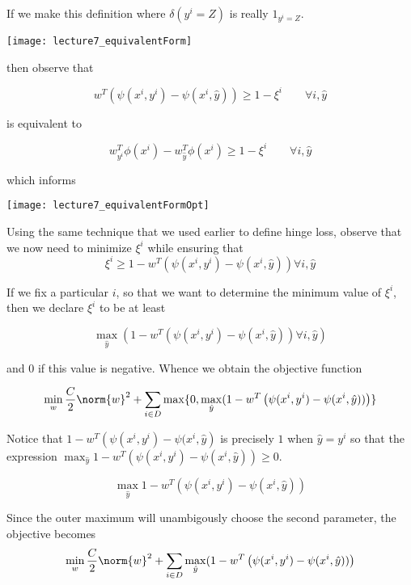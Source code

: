 \documentclass[../main.tex]{subfiles}
\begin{document}
\begin{definition}
    If we make this definition where $\delta(y^{i} = Z)$ is really $1_{y^{i} = Z}$.
    \begin{center}
        \texttt{[image: lecture7\_equivalentForm]}
    \end{center}

    then observe that

    \[
        w^T\left( \psi(x^{i},y^{i}) - \psi(x^{i},\hat{y}) \right) \geq 1 - \xi^{i} \qquad \forall i,\hat{y}
    \]
    
    is equivalent to

    \[
        w_{y^{i}}^T\phi(x^{i}) - w_{\hat{y}}^T\phi(x^{i}) \geq 1 - \xi^{i} \qquad \forall i, \hat{y}
    \]

    which informs \\

    \begin{center}
        \texttt{[image: lecture7\_equivalentFormOpt]}
    \end{center}

    Using the same technique that we used earlier to define hinge loss, observe that
    we now need to minimize $\xi^{i}$ while ensuring that
    \[
        \xi^{i} \geq 1 - w^T\left( \psi(x^{i},y^{i}) - \psi(x^{i},\hat{y}) \right) \forall i, \hat{y}
    \]

    If we fix a particular $i$, so that we want to determine the minimum value of $\xi^{i}$,
    then we declare $\xi^{i}$ to be at least

    \[
        \max_{\hat{y}} (1 - w^T\left( \psi(x^{i},y^{i}) - \psi(x^{i},\hat{y}) \right) \forall i, \hat{y})
    \]

    and $0$ if this value is negative. Whence we obtain the objective function

    \[
        \min_{w} \frac{C}{2}\norm{w}^2 + \sum_{i \in D}^{}\max\{0 , \max_{\hat{y}} (1 - w^T\left( \psi(x^{i},y^{i}) - \psi(x^{i},\hat{y})) \right)\}
    \]

    Notice that $1 - w^T\left( \psi(x^{i},y^{i}) - \psi(x^{i},\hat{y}\right)$ is precisely $1$
    when $\hat{y} = y^{i}$ so that the expression $\max_{\hat{y}} 1 - w^T\left( \psi(x^{i},y^{i}) - \psi(x^{i},\hat{y})\right) \geq 0$.

    \[
        \max_{\hat{y}} 1 - w^T \left( \psi(x^{i},y^{i}) - \psi(x^{i},\hat{y}) \right)
    \]

    Since the outer maximum will unambigously choose the second parameter, the objective becomes
    \[
        \min_{w} \frac{C}{2}\norm{w}^2 + \sum_{i \in D}^{} \max_{\hat{y}} (1 - w^T\left( \psi(x^{i},y^{i}) - \psi(x^{i},\hat{y})) \right)
    \]


\end{definition}
\end{document}
